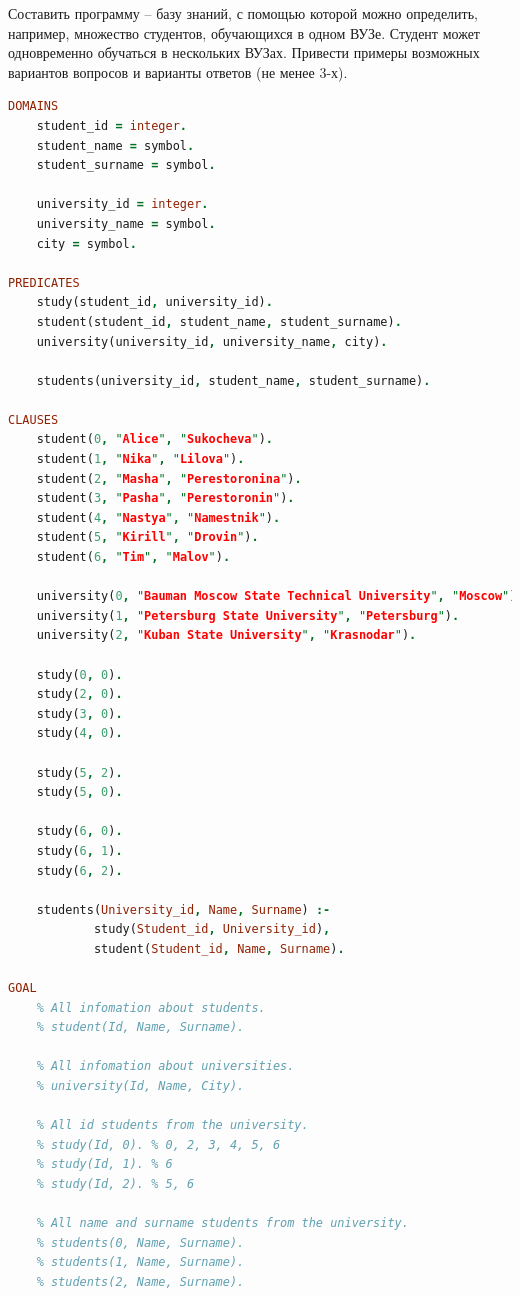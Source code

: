 \documentclass[a4paper,oneside,12pt]{extreport}
\begin{document}
\begin{task}
    Составить программу – базу знаний, с помощью которой можно определить, например, 
    множество студентов, обучающихся в одном ВУЗе. 
    Студент может одновременно обучаться в нескольких ВУЗах. 
    Привести примеры возможных вариантов вопросов и варианты ответов
    (не менее 3-х).

    \begin{lstlisting}[language=Prolog]
DOMAINS 
    student_id = integer.
    student_name = symbol.
    student_surname = symbol.
    
    university_id = integer.
    university_name = symbol.
    city = symbol.

PREDICATES
    study(student_id, university_id).
    student(student_id, student_name, student_surname).
    university(university_id, university_name, city).
    
    students(university_id, student_name, student_surname).
    
CLAUSES
    student(0, "Alice", "Sukocheva").
    student(1, "Nika", "Lilova").
    student(2, "Masha", "Perestoronina").
    student(3, "Pasha", "Perestoronin").
    student(4, "Nastya", "Namestnik").
    student(5, "Kirill", "Drovin").
    student(6, "Tim", "Malov").
    
    university(0, "Bauman Moscow State Technical University", "Moscow").
    university(1, "Petersburg State University", "Petersburg").
    university(2, "Kuban State University", "Krasnodar").
    
    study(0, 0).
    study(2, 0).
    study(3, 0).
    study(4, 0).
    
    study(5, 2).
    study(5, 0).
    
    study(6, 0).
    study(6, 1).
    study(6, 2).
    
    students(University_id, Name, Surname) :- 
            study(Student_id, University_id), 
            student(Student_id, Name, Surname).
    
GOAL
    % All infomation about students. 
    % student(Id, Name, Surname).
    
    % All infomation about universities.
    % university(Id, Name, City).
    
    % All id students from the university.
    % study(Id, 0). % 0, 2, 3, 4, 5, 6
    % study(Id, 1). % 6
    % study(Id, 2). % 5, 6

    % All name and surname students from the university.
    % students(0, Name, Surname).
    % students(1, Name, Surname).
    % students(2, Name, Surname).
    

\end{lstlisting}
\end{task}
\end{document}
